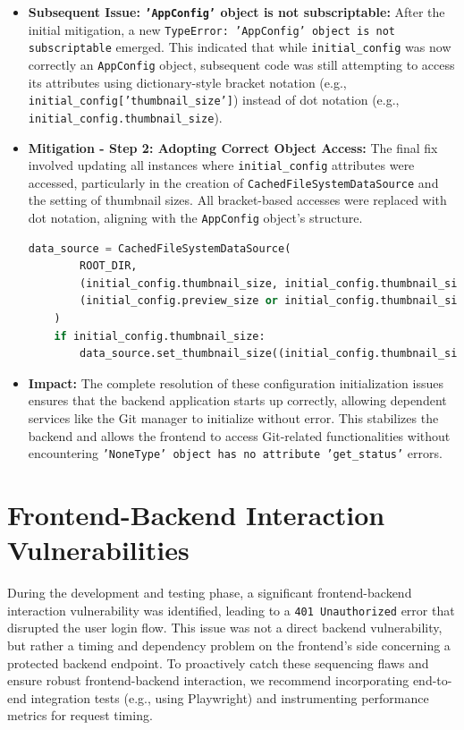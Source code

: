 \documentclass{article}
\begin{document}
\begin{itemize}
    \item \textbf{Subsequent Issue: \texttt{'AppConfig'} object is not subscriptable:}
    After the initial mitigation, a new \texttt{TypeError: 'AppConfig' object is not subscriptable} emerged. This indicated that while \texttt{initial\_config} was now correctly an \texttt{AppConfig} object, subsequent code was still attempting to access its attributes using dictionary-style bracket notation (e.g., \texttt{initial\_config['thumbnail\_size']}) instead of dot notation (e.g., \texttt{initial\_config.thumbnail\_size}).
    \item \textbf{Mitigation - Step 2: Adopting Correct Object Access:}
    The final fix involved updating all instances where \texttt{initial\_config} attributes were accessed, particularly in the creation of \texttt{CachedFileSystemDataSource} and the setting of thumbnail sizes. All bracket-based accesses were replaced with dot notation, aligning with the \texttt{AppConfig} object's structure.

    \begin{lstlisting}[language=Python, caption=Final Fix for AppConfig Access in \texttt{app/main.py}]
    data_source = CachedFileSystemDataSource(
        ROOT_DIR,
        (initial_config.thumbnail_size, initial_config.thumbnail_size),
        (initial_config.preview_size or initial_config.thumbnail_size, initial_config.preview_size or initial_config.thumbnail_size)
    )
    if initial_config.thumbnail_size:
        data_source.set_thumbnail_size((initial_config.thumbnail_size, initial_config.thumbnail_size))
    \end{lstlisting}

    \item \textbf{Impact:}
    The complete resolution of these configuration initialization issues ensures that the backend application starts up correctly, allowing dependent services like the Git manager to initialize without error. This stabilizes the backend and allows the frontend to access Git-related functionalities without encountering \texttt{'NoneType' object has no attribute 'get\_status'} errors.
\end{itemize}

\section{Frontend-Backend Interaction Vulnerabilities}
During the development and testing phase, a significant frontend-backend interaction vulnerability was identified, leading to a \texttt{401 Unauthorized} error that disrupted the user login flow. This issue was not a direct backend vulnerability, but rather a timing and dependency problem on the frontend's side concerning a protected backend endpoint. To proactively catch these sequencing flaws and ensure robust frontend-backend interaction, we recommend incorporating end-to-end integration tests (e.g., using Playwright) and instrumenting performance metrics for request timing.
\end{document}
